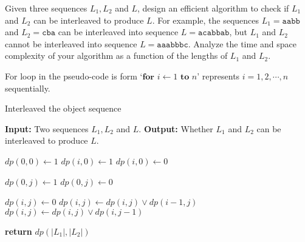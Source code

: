 \problem{}
Given three sequences $L_1, L_2$ and $L$, design an efficient algorithm to check if $L_1$ and $L_2$ can be interleaved to produce $L$.  For example, the sequences $L_1 = \texttt{aabb}$ and $L_2 = \texttt{cba}$ can be interleaved into sequence $L = \texttt{acabbab}$, but $L_1$ and $L_2$ cannot be interleaved into sequence $L = \texttt{aaabbbc}$.  Analyze the time and space complexity of your algorithm as a function of the lengths of $L_1$ and $L_2$.

\solution{}







For loop in the pseudo-code is form `$\textbf{for } i \gets 1 \textbf{ to } n$' represents $i=1,2,\cdots,n$ sequentially.
\begin{algorithm}
    \caption{Interleaved the object sequence}\label{alg:problem-4}
    \begin{algorithmic}[1]
    \State \textbf{Input:} Two sequences $L_1, L_2$ and $L$.
    \State \textbf{Output:} Whether $L_1$ and $L_2$ can be interleaved to produce $L$.
        
    \State $dp(0,0) \gets 1$
            \State $dp(i,0) \gets 1$
        \Else 
            \State $dp(i,0) \gets 0$
        \EndIf
    \EndFor

            \State $dp(0,j) \gets 1$
        \Else 
            \State $dp(0,j) \gets 0$
        \EndIf
    \EndFor
    
            \State $dp(i,j) \gets 0$
                \State $dp(i,j) \gets dp(i,j) \lor dp(i-1,j)$
            \EndIf
                \State $dp(i,j) \gets dp(i,j) \lor dp(i,j-1)$
            \EndIf
        \EndFor
    \EndFor
    
    \State \textbf{return} $dp(|L_1|,|L_2|)$
    \end{algorithmic}
\end{algorithm}









\newpage